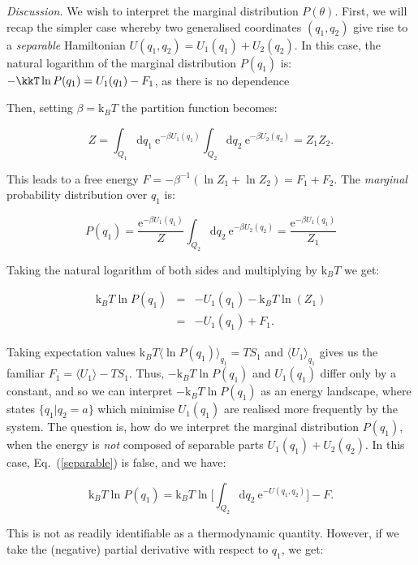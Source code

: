 \documentclass[aps,prl,twocolumn,superscriptaddress]{revtex4-1}
\newcommand{\dd}{\mathrm{d}}
\newcommand{\ee}{\mathrm{e}}
\newcommand{\kk}{\mathrm{k}_B}
\begin{document}
\emph{Discussion.} We wish to interpret the marginal distribution $P(\theta)$. First, we will recap the simpler case whereby two generalised coordinates $(q_1,q_2)$ give rise to a \emph{separable} Hamiltonian $U(q_1,q_2)=U_1(q_1) + U_2(q_2)$. In this case, the natural logarithm of the marginal distribution $P(q_1)$ is: $-\kkT \ln P(q_1) = U_1(q_1) - F_1$, as there is no dependence 

Then, setting $\beta=\kk T$ the partition function becomes:

\begin{equation}
Z = \int_{Q_1} \dd q_1\ \ee^{-\beta U_1(q_1)}\int_{Q_2} \dd q_2 \ \ee^{-\beta U_2(q_2)} = Z_1 Z_2.
\end{equation}

This leads to a free energy $F=-\beta^{-1}(\ln{Z_1}+\ln{Z_2}) = F_1 + F_2$. The \emph{marginal} probability distribution over $q_1$ is:

\begin{equation} \label{separable}
P(q_1) = \frac{\ee^{-\beta U_1(q_1)}}{Z} \int_{Q_2} \dd q_2 \ \ee^{-\beta U_2(q_2)} =  \frac{\ee^{-\beta U_1(q_1)}}{Z_1}
\end{equation}

Taking the natural logarithm of both sides and multiplying by $\kk T$ we get:

\begin{eqnarray}
\kk T\ln{P(q_1)} & = & -U_1(q_1) - \kk T\ln(Z_1) \nonumber \\
& = & -U_1(q_1) + F_1.
\end{eqnarray}

Taking expectation values $\kk T \langle \ln{P(q_1)}\rangle_{q_1} = T S_1$ and $\langle U_1\rangle_{q_1}$ gives us the familiar $F_1 = \langle U_1 \rangle - T S_1$. Thus, $-\kk T\ln{P(q_1)}$ and $U_1(q_1)$ differ only by a constant, and so we can interpret $-\kk T\ln{P(q_1)}$ as an energy landscape, where states $\{q_1|q_2=a\}$ which minimise $U_1(q_1)$ are realised more frequently by the system. The question is, how do we interpret the marginal distribution $P(q_1)$, when the energy is \emph{not} composed of separable parts $U_1(q_1)+U_2(q_2)$. In this case, Eq.\ (\ref{separable}) is false, and we have:

\begin{equation}
\kk T\ln{P(q_1)} = \kk T\ln\Big[ \int_{Q_2} \dd q_2 \ \ee^{-U(q_1,q_2)} \Big] - F.
\end{equation}

This is not as readily identifiable as a thermodynamic quantity. However, if we take the (negative) partial derivative with respect to $q_1$, we get:
\end{document}

